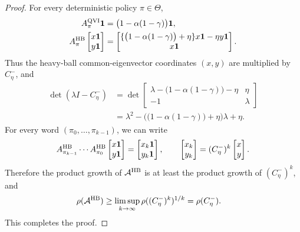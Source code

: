 \documentclass[letterpaper]{article}
\numberwithin{equation}{section}
\begin{document}
\begin{proof}
For every deterministic policy $\pi\in\Theta$,
\begin{align*}
  A_\pi^{\rm QVI}\mathbf{1}
  &=\bigl(1-\alpha(1-\gamma)\bigr)\mathbf{1},\\
  A_\pi^{\rm HB}
  \begin{bmatrix}x\mathbf{1}\\y\mathbf{1}\end{bmatrix}
  &=
  \begin{bmatrix}
    \{\bigl(1-\alpha(1-\gamma)\bigr)+\eta\}x\mathbf{1}-\eta y\mathbf{1}\\
    x\mathbf{1}
  \end{bmatrix}.
\end{align*}
Thus the heavy-ball common-eigenvector coordinates $(x,y)$ are multiplied by
$C_\eta^-$, and
\begin{align*}
  \det(\lambda I-C_\eta^-)
  &=\det
  \begin{bmatrix}
    \lambda-\bigl(1-\alpha(1-\gamma)\bigr)-\eta&\eta\\
    -1&\lambda
  \end{bmatrix}\\
  &=\lambda^2-\bigl(\bigl(1-\alpha(1-\gamma)\bigr)+\eta\bigr)\lambda+
  \eta.
\end{align*}
For every word $(\pi_0,\ldots,\pi_{k-1})$, we can write
\begin{align*}
  A_{\pi_{k-1}}^{\rm HB}\cdots A_{\pi_0}^{\rm HB}
  \begin{bmatrix}x\mathbf{1}\\y\mathbf{1}\end{bmatrix}
  =
  \begin{bmatrix}x_k\mathbf{1}\\y_k\mathbf{1}\end{bmatrix},
  \qquad
  \begin{bmatrix}x_k\\y_k\end{bmatrix}=(C_\eta^-)^k\begin{bmatrix}x\\y\end{bmatrix}.
\end{align*}
Therefore the product growth of $\mathcal A^{\rm HB}$ is at least the product
growth of $(C_\eta^-)^k$, and
\begin{align*}
  \rho(\mathcal A^{\rm HB})
  &\ge
  \limsup_{k\to\infty}\rho((C_\eta^-)^k)^{1/k}
  =\rho(C_\eta^-).
\end{align*}
This completes the proof.
\end{proof}
\end{document}
